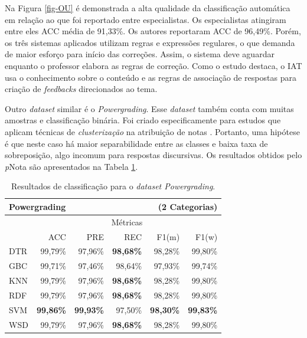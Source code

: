 Na Figura \ref{fig-OU} é demonstrada a alta qualidade da classificação automática em relação ao que foi reportado entre especialistas. Os especialistas atingiram entre eles ACC média de 91,33\%. Os autores \cite{butcher2010} reportaram ACC de 96,49\%. Porém, os três sistemas aplicados utilizam regras e expressões regulares, o que demanda de maior esforço para início das correções. Assim, o sistema deve aguardar enquanto o professor elabora as regras de correção. Como o estudo destaca, o IAT usa o conhecimento sobre o conteúdo e as regras de associação de respostas para criação de \textit{feedbacks} direcionados ao tema.

Outro \textit{dataset} similar é o \textit{Powergrading}. Esse \textit{dataset} também conta com muitas amostras e classificação binária. Foi criado especificamente para estudos que aplicam técnicas de \textit{clusterização} na atribuição de notas \cite{basu2013}. Portanto, uma hipótese é que neste caso há maior separabilidade entre as classes e baixa taxa de sobreposição, algo incomum para respostas discursivas. Os resultados obtidos pelo \textit{p}Nota são apresentados na Tabela \ref{tab-PG}.

\begin{table}
\centering
\caption{Resultados de classificação para o \textit{dataset Powergrading}.}
\label{tab-PG}
\begin{tabular}{l r r r r r}
    \hline
    \multicolumn{4}{l}{\textbf{Powergrading}} & \multicolumn{2}{r}{(2 Categorias)} \\ \hline
     & \multicolumn{5}{c}{M{\'e}tricas} \\ \cline{2-6}

     & ACC & PRE & REC & F1(m) & F1(w) \\ \cline{2-6}
    DTR & 99,79\% & 97,96\% & \textbf{98,68\%} & 98,28\% & 99,80\% \\
    GBC & 99,71\% & 97,46\% & 98,64\% & 97,93\% & 99,74\% \\
    KNN & 99,79\% & 97,96\% & \textbf{98,68\%} & 98,28\% & 99,80\% \\
    RDF & 99,79\% & 97,96\% & \textbf{98,68\%} & 98,28\% & 99,80\% \\
    SVM & \textbf{99,86\%} & \textbf{99,93\%} & 97,50\% & \textbf{98,30\%} & \textbf{99,83\%} \\
    WSD & 99,79\% & 97,96\% & \textbf{98,68\%} & 98,28\% & 99,80\% \\

    \hline
    \hline
\end{tabular}
\end{table}


